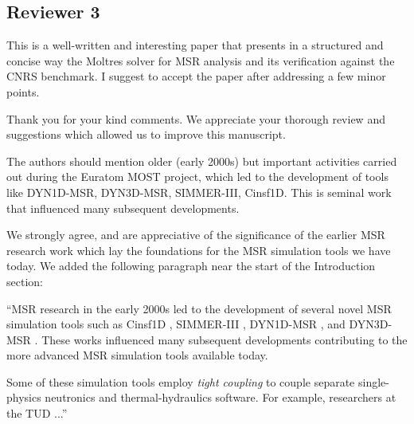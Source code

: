 \documentclass[answers,12pt]{exam}
\begin{document}
\begin{questions}

\section*{Reviewer 3}
        \question This is a well-written and interesting paper that presents in a structured and concise way the Moltres solver for MSR analysis and its verification against the CNRS benchmark. I suggest to accept the paper after addressing a few minor points.
        \begin{solution}
            Thank you for your kind comments. We appreciate your thorough
            review and suggestions which allowed us to improve this manuscript.
        \end{solution}
        \question The authors should mention older (early 2000s) but important
        activities carried out during the Euratom MOST project, which led to
        the development of tools like DYN1D-MSR, DYN3D-MSR, SIMMER-III,
        Cinsf1D. This is seminal work that influenced many subsequent developments.
        \begin{solution}
        	We strongly agree, and are appreciative of the significance of
        	the earlier MSR research work
        	which lay the foundations for the MSR simulation tools we have
        	today. We added the following paragraph near the start of the
        	Introduction section:
        	
        	``\gls{MSR} research in the early 2000s led to the development of several novel
\gls{MSR} simulation tools such as Cinsf1D \cite{lecarpentier_neutronic_2003},
SIMMER-III \cite{rineiski_kinetics_2005}, DYN1D-MSR
\cite{krepel_dyn1d-msr_2005}, and DYN3D-MSR \cite{krepel_dyn3d-msr_2007}. These
works influenced many subsequent developments contributing to the more advanced
\gls{MSR} simulation tools available today.

Some of these simulation tools employ \textit{tight coupling} to couple
separate single-physics neutronics and thermal-hydraulics software. For
example, researchers at the \gls{TUD} ...''
        \end{solution}


\end{questions}
\end{document}
